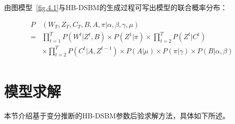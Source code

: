 由图模型~\ref{fig.4.1}与HB-DSBM的生成过程可写出模型的联合概率分布：

\begin{equation}
\begin{split}
P&(W_T, Z_T, C_T, B, A, \pi | \alpha, \beta, \gamma, \mu) \\
= & \prod_{t=1}^T P(W^t | Z^t, B) \times  P(Z^1 | \pi) \times \prod_{t=2}^T P(Z^t | C^t) \\
& \times \prod_{t=2}^T P(C^t | A, Z^{t-1}) \times P(A | \mu) \times P(\pi | \gamma) \times P(B | \alpha, \beta) \\
\end{split}
\end{equation}






\section{模型求解}
本节介绍基于变分推断的HB-DSBM参数后验求解方法，具体如下所述。

